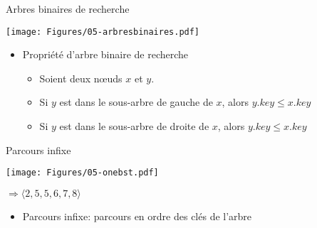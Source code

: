\begin{frame}{Arbres binaires de recherche}

\centerline{\texttt{[image: Figures/05-arbresbinaires.pdf]}}

\begin{itemize}
\item Propriété d'arbre binaire de recherche
\begin{itemize}
\item Soient deux n\oe uds $x$ et $y$.
\item Si $y$ est dans le sous-arbre de gauche de $x$, alors $y.key\leq x.key$
\item Si $y$ est dans le sous-arbre de droite de $x$, alors $y.key\leq x.key$
\end{itemize}
\end{itemize}

\end{frame}

\begin{frame}{Parcours infixe}

\begin{center}
\texttt{[image: Figures/05-onebst.pdf]}
\bigskip

$\Rightarrow \langle 2, 5, 5, 6, 7, 8\rangle$
\end{center}

\begin{itemize}
\item Parcours infixe: parcours en ordre des clés de l'arbre

\bigskip
\begin{center}
\begin{small}
\end{small}
\end{center}

\end{itemize}

\end{frame}

